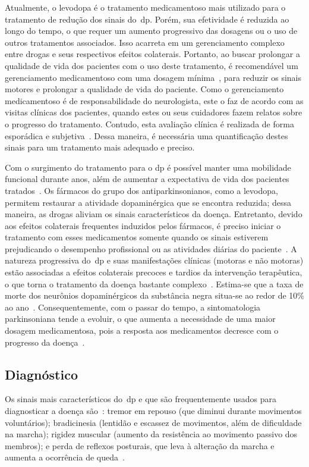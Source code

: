 Atualmente, o levodopa é o tratamento medicamentoso mais utilizado para o tratamento de redução dos sinais do~\ac{dp}. Porém, sua efetividade é reduzida ao longo do tempo, o que requer um aumento progressivo das dosagens ou o uso de outros tratamentos associados. Isso acarreta em um gerenciamento complexo entre drogas e seus respectivos efeitos colaterais. Portanto, ao buscar prolongar a qualidade de vida dos pacientes com o uso deste tratamento, é recomendável um gerenciamento medicamentoso com uma dosagem mínima~\cite{national2006parkinson}, para reduzir os sinais motores e prolongar a qualidade de vida do paciente. Como o gerenciamento medicamentoso é de responsabilidade do neurologista, este o faz de acordo com as visitas clínicas dos pacientes, quando estes ou seus cuidadores fazem relatos sobre o progresso do tratamento. Contudo, esta avaliação clínica é realizada de forma esporádica e subjetiva~\cite{protpar010,quantitativeparkinson2011}. Dessa maneira, é necessária uma quantificação destes sinais 
para um tratamento mais adequado e preciso. 

Com o surgimento do tratamento para o \ac{dp} é possível manter uma mobilidade funcional durante anos, além de aumentar a expectativa de vida dos pacientes tratados~\cite{abn2010}. Os fármacos do grupo dos antiparkinsonianos, como a levodopa, permitem restaurar a atividade dopaminérgica que se encontra reduzida; dessa maneira, as drogas aliviam os sinais característicos da doença. Entretanto, devido aos efeitos colaterais frequentes induzidos pelos fármacos, é preciso iniciar o tratamento com esses medicamentos somente quando os sinais estiverem prejudicando o desempenho profissional ou as atividades diárias do paciente~\cite{abn2010}. A natureza progressiva do~\ac{dp} e suas manifestações clínicas (motoras e não motoras) estão associadas a efeitos colaterais precoces e tardios da intervenção terapêutica, o que torna o tratamento da doença bastante complexo~\cite{protpar010}. Estima-se que a taxa de morte dos neurônios dopaminérgicos da substância negra situa-se ao redor de 10$\%$ ao ano~\cite{national2006parkinson}. Consequentemente, com o passar do tempo, a sintomatologia parkinsoniana tende a evoluir, o que aumenta a necessidade de uma maior dosagem medicamentosa, pois a resposta aos medicamentos decresce com o progresso da doença~\cite{protpar010}.

 
\subsection{Diagnóstico}
Os sinais mais característicos do~\ac{dp} e que são frequentemente usados para diagnosticar a doença são~\cite{rowlandtratado}: tremor em repouso (que diminui durante movimentos voluntários); bradicinesia (lentidão e escassez de movimentos, além de dificuldade na marcha); rigidez muscular (aumento da resistência ao movimento passivo dos membros); e perda de reflexos posturais, que leva à alteração da marcha e aumenta a ocorrência de queda~\cite{abn2010,tolosa06}. 

